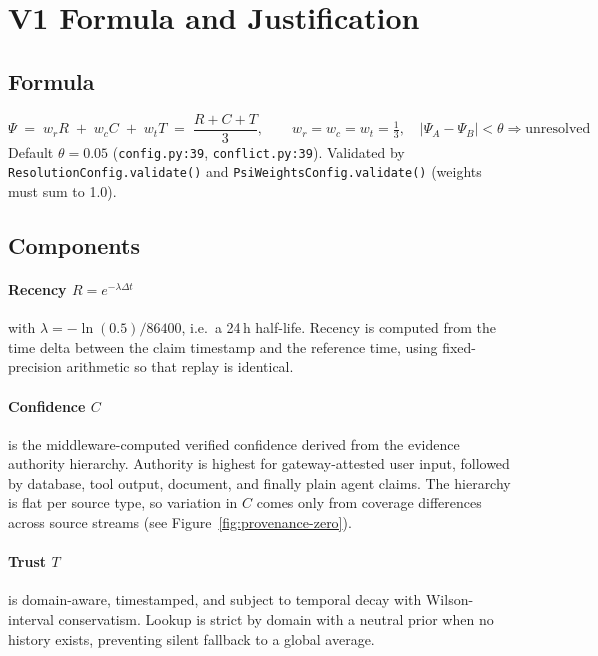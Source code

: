 \documentclass[12pt,a4paper]{article}
\begin{document}
\section{V1 Formula and Justification}

\subsection{Formula}
\begin{equation}
\Psi \;=\; w_r R \;+\; w_c C \;+\; w_t T \;=\; \frac{R+C+T}{3},\qquad w_r=w_c=w_t=\tfrac13,\quad |\Psi_A-\Psi_B|<\theta\Rightarrow\text{unresolved}
\end{equation}
Default $\theta=0.05$ (\texttt{config.py:39}, \texttt{conflict.py:39}). Validated by \texttt{ResolutionConfig.validate()} and \texttt{PsiWeightsConfig.validate()} (weights must sum to 1.0).

\subsection{Components}
\paragraph{Recency $R=e^{-\lambda\Delta t}$} with $\lambda=-\ln(0.5)/86400$, i.e.\ a 24\,h half-life. Recency is computed from the time delta between the claim timestamp and the reference time, using fixed-precision arithmetic so that replay is identical.

\paragraph{Confidence $C$} is the middleware-computed verified confidence derived from the evidence authority hierarchy. Authority is highest for gateway-attested user input, followed by database, tool output, document, and finally plain agent claims. The hierarchy is flat per source type, so variation in $C$ comes only from coverage differences across source streams (see Figure~\ref{fig:provenance-zero}).

\paragraph{Trust $T$} is domain-aware, timestamped, and subject to temporal decay with Wilson-interval conservatism. Lookup is strict by domain with a neutral prior when no history exists, preventing silent fallback to a global average.
\end{document}
